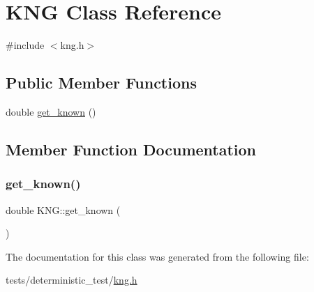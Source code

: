 \hypertarget{classKNG}{}\section{K\+NG Class Reference}
\label{classKNG}


{\ttfamily \#include $<$kng.\+h$>$}

\subsection*{Public Member Functions}
\begin{DoxyCompactItemize}
\item 
double \hyperlink{classKNG_a50d605dd7f480f9dc9bfaf7540bc82a3}{get\+\_\+known} ()
\end{DoxyCompactItemize}


\subsection{Member Function Documentation}
\mbox{\label{classKNG_a50d605dd7f480f9dc9bfaf7540bc82a3}} 
\subsubsection{\texorpdfstring{get\+\_\+known()}{get\_known()}}
{\footnotesize\ttfamily double K\+N\+G\+::get\+\_\+known (\begin{DoxyParamCaption}{ }\end{DoxyParamCaption})\hspace{0.3cm}{\ttfamily [inline]}}



The documentation for this class was generated from the following file\+:\begin{DoxyCompactItemize}
\item 
tests/deterministic\+\_\+test/\hyperlink{kng_8h}{kng.\+h}\end{DoxyCompactItemize}
